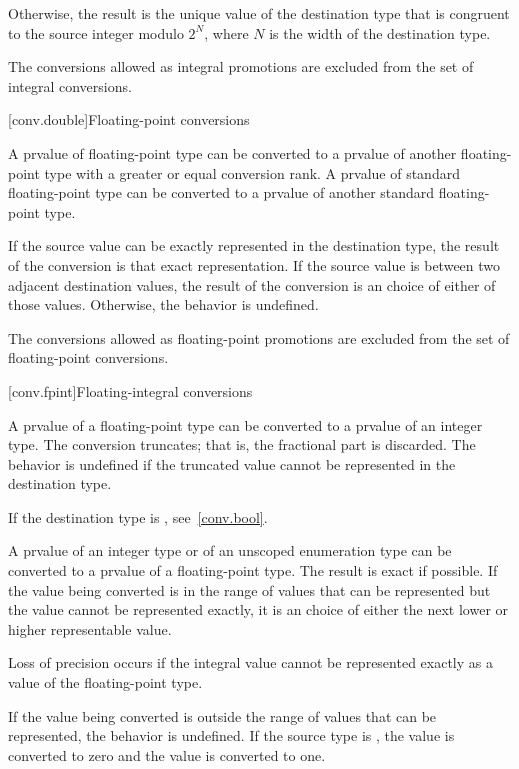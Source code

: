 \pnum
{}%
%
Otherwise, the result is the unique value of the destination type
that is congruent to the source integer modulo $2^N$,
where $N$ is the width of the destination type.

\pnum
The conversions allowed as integral promotions are excluded from the set
of integral conversions.

[conv.double]{Floating-point conversions}

\pnum
{}%
A prvalue of floating-point type can be converted to a prvalue of
another floating-point type
with a greater or equal conversion rank.
A prvalue of standard floating-point type can be converted to
a prvalue of another standard floating-point type.

\pnum
If the source value can be exactly
represented in the destination type, the result of the conversion is
that exact representation. If the source value is between two adjacent
destination values, the result of the conversion is an
 choice of either of those values.
Otherwise, the behavior is undefined.

\pnum
The conversions allowed as floating-point promotions are excluded from
the set of floating-point conversions.

[conv.fpint]{Floating-integral conversions}

\pnum
{}%
A prvalue of a floating-point type can be converted to a prvalue of an
integer type. The conversion truncates; that is, the fractional part is
discarded.
%
The behavior is undefined if the truncated value cannot be represented
in the destination type.
\begin{note}
If the destination type is , see~\ref{conv.bool}.
\end{note}

\pnum
{}%
%
%
A prvalue of an integer type or of an unscoped enumeration type can be converted to
a prvalue of a floating-point type. The result is exact if possible. If the value being
converted is in the range of values that can be represented but the value cannot be
represented exactly, it is an  choice of either the next lower or higher representable
value.
\begin{note}
Loss of precision occurs if the integral value cannot be represented
exactly as a value of the floating-point type.
\end{note}
If the value being converted is
outside the range of values that can be represented, the behavior is undefined. If the
source type is , the value  is converted to zero and the value
 is converted to one.


